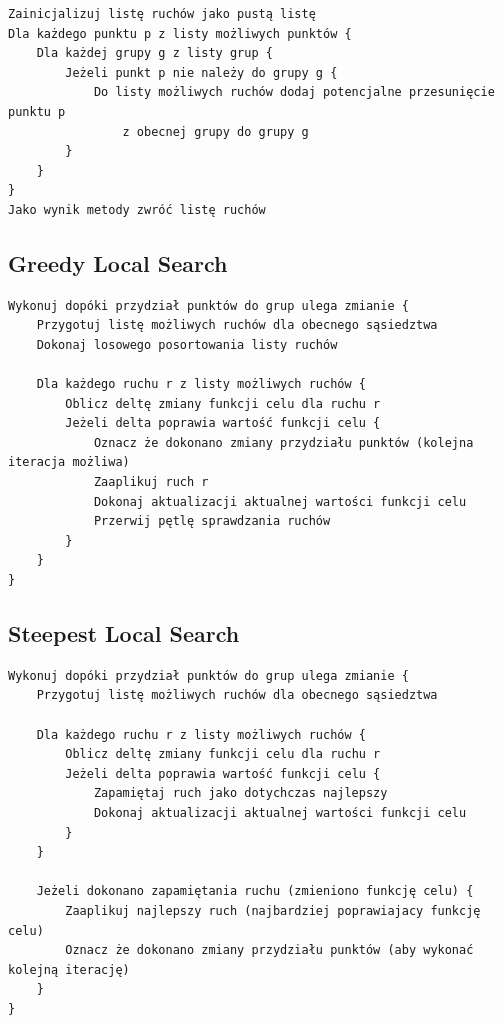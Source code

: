 \documentclass[main.tex]{subfiles}
\begin{document}
\begin{verbatim}
Zainicjalizuj listę ruchów jako pustą listę
Dla każdego punktu p z listy możliwych punktów {
    Dla każdej grupy g z listy grup {
        Jeżeli punkt p nie należy do grupy g {
            Do listy możliwych ruchów dodaj potencjalne przesunięcie punktu p
                z obecnej grupy do grupy g 
        }
    }
}
Jako wynik metody zwróć listę ruchów
\end{verbatim}

\subsection{Greedy Local Search}
\begin{verbatim}
Wykonuj dopóki przydział punktów do grup ulega zmianie {
    Przygotuj listę możliwych ruchów dla obecnego sąsiedztwa
    Dokonaj losowego posortowania listy ruchów
    
    Dla każdego ruchu r z listy możliwych ruchów {
        Oblicz deltę zmiany funkcji celu dla ruchu r
        Jeżeli delta poprawia wartość funkcji celu {
            Oznacz że dokonano zmiany przydziału punktów (kolejna iteracja możliwa)
            Zaaplikuj ruch r
            Dokonaj aktualizacji aktualnej wartości funkcji celu
            Przerwij pętlę sprawdzania ruchów
        }
    }
}
\end{verbatim}

\subsection{Steepest Local Search}
\begin{verbatim}
Wykonuj dopóki przydział punktów do grup ulega zmianie {
    Przygotuj listę możliwych ruchów dla obecnego sąsiedztwa
    
    Dla każdego ruchu r z listy możliwych ruchów {
        Oblicz deltę zmiany funkcji celu dla ruchu r
        Jeżeli delta poprawia wartość funkcji celu {
            Zapamiętaj ruch jako dotychczas najlepszy
            Dokonaj aktualizacji aktualnej wartości funkcji celu
        }
    }
    
    Jeżeli dokonano zapamiętania ruchu (zmieniono funkcję celu) {
        Zaaplikuj najlepszy ruch (najbardziej poprawiajacy funkcję celu)
        Oznacz że dokonano zmiany przydziału punktów (aby wykonać kolejną iterację)
    }
}
\end{verbatim}
\end{document}
